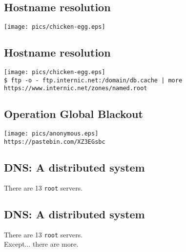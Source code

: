 \documentclass[xga]{xdvislides}
\begin{document}
\subsection{Hostname resolution}
\vspace*{\fill}
\begin{center}
	\texttt{[image: pics/chicken-egg.eps]} \\
	\vspace*{\fill}
\end{center}

\subsection{Hostname resolution}
\vspace*{\fill}
\begin{center}
	\texttt{[image: pics/chicken-egg.eps]} \\
	\addvspace{.2in}
	\verb+$ ftp -o - ftp.internic.net:/domain/db.cache | more+ \\
	\verb+https://www.internic.net/zones/named.root+
	\vspace*{\fill}
\end{center}

\subsection{Operation Global Blackout}
\vspace*{\fill}
\begin{center}
	\texttt{[image: pics/anonymous.eps]} \\
	\addvspace{.2in}
	\verb+https://pastebin.com/XZ3EGsbc+ \\
	\addvspace{.1in}
\end{center}
\vspace*{\fill}

\subsection{DNS: A distributed system}
\vspace{.5in}
\begin{center}
	\Huge
	There are 13 \verb+root+ servers. \\
\end{center}
\Normalsize

\subsection{DNS: A distributed system}
\vspace{.5in}
\begin{center}
	\Huge
	There are 13 \verb+root+ servers. \\
	\vspace{.5in}
	Except... there are more.
\end{center}
\Normalsize
\end{document}
